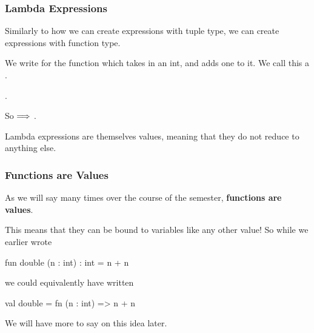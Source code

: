 \documentclass[aspectratio=169]{beamer}
\begin{document}
\begin{frame}[fragile]
  \frametitle{Lambda Expressions}

  Similarly to how we can create expressions with tuple type, we can create expressions
  with function type.

  \pause
  \vspace{\fill}

  We write  for the function which takes in an int, and adds one to it.
  We call this a .

  \pause
  \vspace{5pt}

  .

  \pause
  \vspace{\fill}

  So  $\Longrightarrow$ .

  \pause
  \vspace{\fill}

  Lambda expressions are themselves values, meaning that they do not reduce to anything else.

  \pause
  \vspace{\fill}

\end{frame}

\begin{frame}[fragile]
  \frametitle{Functions are Values}

  As we will say many times over the course of the semester, \textbf{functions are values}.

  \pause
  \vspace{\fill}

  This means that they can be bound to variables like any other value! So while we earlier
  wrote
  \begin{codeblock}
    fun double (n : int) : int = n + n
  \end{codeblock}

  \pause
  \vspace{\fill}

  we could equivalently have written
  \begin{codeblock}
    val double = fn (n : int) => n + n
  \end{codeblock}

  \vspace{\fill}

  We will have more to say on this idea later.
\end{frame}
\end{document}
